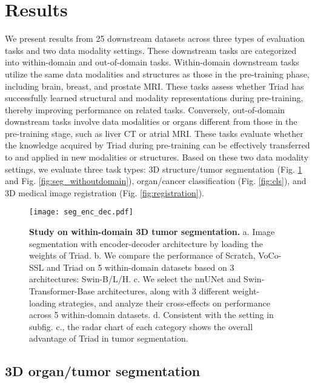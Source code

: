 \section{Results}

We present results from 25 downstream datasets across three types of evaluation tasks and two data modality settings. These downstream tasks are categorized into within-domain and out-of-domain tasks.
Within-domain downstream tasks utilize the same data modalities and structures as those in the pre-training phase, including brain, breast, and prostate MRI. These tasks assess whether Triad has successfully learned structural and modality representations during pre-training, thereby improving performance on related tasks.
Conversely, out-of-domain downstream tasks involve data modalities or organs different from those in the pre-training stage, such as liver CT or atrial MRI. These tasks evaluate whether the knowledge acquired by Triad during pre-training can be effectively transferred to and applied in new modalities or structures.
Based on these two data modality settings, we evaluate three task types: 3D structure/tumor segmentation (Fig. \ref{fig:seg_enc_dec} and Fig. \ref{fig:seg_withoutdomain}), organ/cancer classification (Fig. \ref{fig:cls}), and 3D medical image registration (Fig. \ref{fig:registration}).

\begin{figure}[!ht] 
	\centering
	\texttt{[image: seg\_enc\_dec.pdf]}
	\caption{\textbf{Study on within-domain 3D tumor segmentation.} a. Image segmentation with encoder-decoder architecture by loading the weights of Triad. b. We compare the performance of Scratch, VoCo-SSL and Triad on 5 within-domain datasets based on 3 architectures: Swin-B/L/H. c. We select the nnUNet and Swin-Transformer-Base architectures, along with 3 different weight-loading strategies, and analyze their cross-effects on performance across 5 within-domain datasets. d. Consistent with the setting in subfig. c., the radar chart of each category shows the overall advantage of Triad in tumor segmentation. }
	\label{fig:seg_enc_dec} 
\end{figure}

\subsection{3D organ/tumor segmentation}

